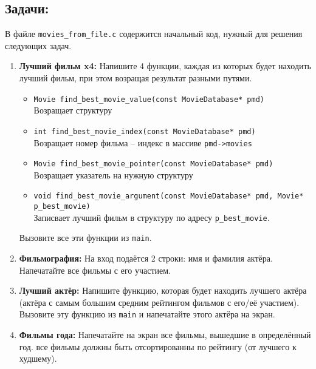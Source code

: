 \documentclass{article}
\begin{document}
\newpage
\subsection*{Задачи:}
В файле \texttt{movies\_from\_file.c} содержится начальный код, нужный для решения следующих задач.
\begin{enumerate}
\item \textbf{Лучший фильм x4:} Напишите 4 функции, каждая из которых будет находить лучший фильм, при этом возращая результат разными путями. 
\begin{itemize}
\item \texttt{Movie find\_best\_movie\_value(const MovieDatabase* pmd)}\\
Возращает структуру
\item \texttt{int find\_best\_movie\_index(const MovieDatabase* pmd)} \\
Возращает номер фильма -- индекс в массиве \texttt{pmd->movies}
\item \texttt{Movie find\_best\_movie\_pointer(const MovieDatabase* pmd)}\\
Возращает указатель на нужную структуру
\item \texttt{void find\_best\_movie\_argument(const MovieDatabase* pmd, Movie* p\_best\_movie)}\\
Записвает лучший фильм в структуру по адресу \texttt{p\_best\_movie}.
\end{itemize}
Вызовите все эти функции из \texttt{main}.
\item \textbf{Фильмография:} На вход подаётся 2 строки: имя и фамилия актёра. Напечатайте все фильмы с его участием.
\item \textbf{Лучший актёр:} Напишите функцию, которая будет находить лучшего актёра (актёра с самым большим средним рейтингом фильмов с его/её участием). Вызовите эту функцию из \texttt{main} и напечатайте этого актёра на экран.
\item \textbf{Фильмы года:} Напечатайте на экран все фильмы, вышедшие в определённый год. все фильмы должны быть отсортированны по рейтингу (от лучшего к худшему).
\end{enumerate}
\end{document}

